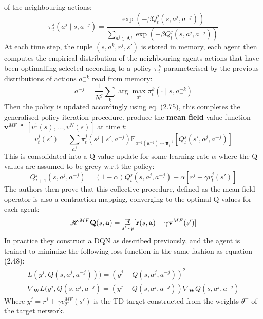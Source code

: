 of the neighbouring actions:
\begin{equation}
    \pi^j_t(a^j \mid s, a^{-j}) =\frac{\exp(-\beta Q^j_t(s,a^j,a^{-j}))}{\sum_{a^j \in \mathbf{A}^j}\exp(-\beta Q^j_t(s,a^j,a^{-j}))}
\end{equation}
At each time step, the tuple $(s, {a^k}, {r^j}, s')$ is stored in memory,
each agent then computes the empirical distribution of the neighbouring
agents actions that have been optimalling selected according to a policy 
$\pi^k_t$ parameterised by the previous distributions of actions $a^{-k}_-$ read from memory:
\begin{equation}
    a^{-j} = \frac{1}{N^j} \sum_k \arg \max_{a^k} \pi^k_t(\cdot \mid s, a^{-k}_-)
\end{equation}
Then the policy is updated accordingly using eq. (2.75), this completes the generalised
policy iteration procedure. \cite{Yang2018} produce the \textbf{mean field} value function 
$\mathbf{v}^{MF} \triangleq [v^1(s),\hdots, v^N(s)]$ at time $t$:
\begin{equation}
    v^j_t(s')= \sum_{a^j}\pi^j_t(s^j \mid s', a^{-j}) \mathbb{E}_{a^{-j}(\mathbf{a}^{-j}) \backsim \boldsymbol \pi_t^{-j}}[Q^j_t(s',a^j,a^{-j})]
\end{equation}
This is consolidated into a Q value update for some learning rate $\alpha$ where the Q values are
assumed to be greey w.r.t the policy:
\begin{equation}
    Q^j_{t+1}(s,a^j,a^{-j})= (1-\alpha)Q^j_t(s,a^j,a^{-j}) +\alpha[r^j+ \gamma v^j_t(s')]
\end{equation}
The authors then prove that this collective procedure, defined as the mean-field operator
is also a contraction mapping, converging to the optimal Q values for each agent:
\begin{equation}
    \mathscr{H}^{MF} \mathbf{Q}(s, \mathbf{a}) = \E_{s'\backsim p}[\mathbf{r}(s,\mathbf{a}) +\gamma \mathbf{v}^{MF}(s')]
\end{equation}
In practice they construct a DQN as described previously, and the agent is trained to
minimize the following loss function in the same fashion as equation (2.48):
\begin{equation}
    \begin{gathered}
        L(y^j, Q(s, a^j, a^{-j}))) = (y^j - Q(s, a^j, a^{-j}))^2 \\
        \nabla_{\mathbf{W}} L(y^j, Q(s, a^j, a^{-j}) = (y^j - Q(s, a^j, a^{-j})) \nabla_{\mathbf{W}} Q(s, a^j, a^{-j})
    \end{gathered}
\end{equation}
Where $y^j = r^j + \gamma v^{MF}_{\theta^-}(s')$ is the TD target constructed from the weights $\theta^-$ of the target network.

